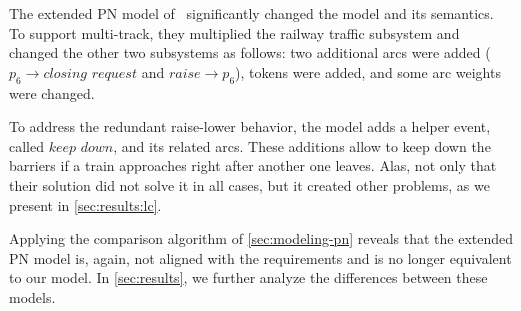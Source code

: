 \documentclass[10pt,journal,compsoc]{IEEEtran}
\theoremstyle{definition}
\begin{document}
The extended PN model of~\cite{ghazel2016customizable} significantly changed the model and its semantics. To support multi-track, they multiplied the railway traffic subsystem and changed the other two subsystems as follows: two additional arcs were added ($p_6 \rightarrow \mathit{closing}$ $\mathit{request}$ and $raise \rightarrow p_6$), tokens were added, and some arc weights were changed. 

To address the redundant raise-lower behavior, the model adds a helper event, called $\mathit{keep}$ $\mathit{down}$, and its related arcs. These additions allow to keep down the barriers if a train approaches right after another one leaves. Alas, not only that their solution did not solve it in all cases, but it created other problems, as we present in \autoref{sec:results:lc}.

Applying the comparison algorithm of \autoref{sec:modeling-pn} reveals that the extended PN model is, again, not aligned with the requirements and is no longer equivalent to our model. 
In \autoref{sec:results}, we further analyze the differences between these models.



\end{document}
